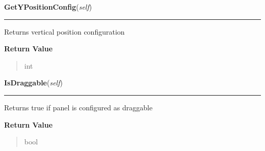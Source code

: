     \label{ImagePanel:ImagePanel:GetYPositionConfig}

    \vspace{0.5ex}

\hspace{.8\funcindent}\begin{boxedminipage}{\funcwidth}

    \raggedright \textbf{GetYPositionConfig}(\textit{self})

    \vspace{-1.5ex}

    \rule{\textwidth}{0.5\fboxrule}
\setlength{\parskip}{2ex}
    Returns vertical position configuration

\setlength{\parskip}{1ex}
      \textbf{Return Value}
    \vspace{-1ex}

      \begin{quote}
      int

      \end{quote}

    \end{boxedminipage}

    \label{ImagePanel:ImagePanel:IsDraggable}

    \vspace{0.5ex}

\hspace{.8\funcindent}\begin{boxedminipage}{\funcwidth}

    \raggedright \textbf{IsDraggable}(\textit{self})

    \vspace{-1.5ex}

    \rule{\textwidth}{0.5\fboxrule}
\setlength{\parskip}{2ex}
    Returns true if panel is configured as draggable

\setlength{\parskip}{1ex}
      \textbf{Return Value}
    \vspace{-1ex}

      \begin{quote}
      bool

      \end{quote}

    \end{boxedminipage}

